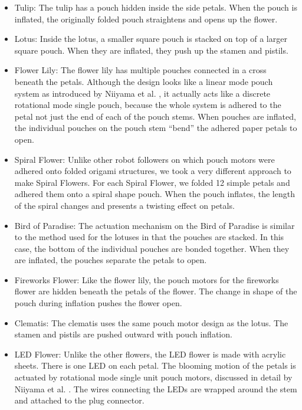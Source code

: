 \documentclass[letterpaper, 10 pt, conference]{ieeeconf}  %
\begin{document}
\begin{itemize}
	
	\item Tulip: The tulip has a pouch hidden inside the side petals. When the pouch is inflated, the originally folded pouch straightens and opens up the flower.
	\item Lotus: Inside the lotus, a smaller square pouch is stacked on top of a larger square pouch. When they are inflated, they push up the stamen and pistils.
	\item Flower Lily: The flower lily has multiple pouches connected in a cross beneath the petals. Although the design looks like a linear mode pouch system as introduced by Niiyama et al. \cite{NiiyamaICRA2014}, it actually acts like a discrete rotational mode single pouch, because the whole system is adhered to the petal not just the end of each of the pouch stems. When pouches are inflated, the individual pouches on the pouch stem ``bend'' the adhered paper petals to open.
	\item Spiral Flower: Unlike other robot followers on which pouch motors were adhered onto folded origami structures, we took a very different approach to make Spiral Flowers. For each Spiral Flower, we folded 12 simple petals and adhered them onto a spiral shape pouch. When the pouch inflates, the length of the spiral changes and presents a twisting effect on petals.
	\item Bird of Paradise: The actuation mechanism on the Bird of Paradise is similar to the method used for the lotuses in that the pouches are stacked. In this case, the bottom of the individual pouches are bonded together. When they are inflated, the pouches separate the petals to open.
	\item Fireworks Flower:  Like the flower lily, the pouch motors for the fireworks flower are hidden beneath the petals of the flower. The change in shape of the pouch during inflation pushes the flower open.
	\item Clematis: The clematis uses the same pouch motor design as the lotus. The stamen and pistils are pushed outward with pouch inflation.
	\item LED Flower: Unlike the other flowers, the LED flower is made with acrylic sheets. There is one LED on each petal. The blooming motion of the petals is actuated by rotational mode single unit pouch motors, discussed in detail by Niiyama et al. \cite{NiiyamaICRA2014}. The wires connecting the LEDs are wrapped around the stem and attached to the plug connector. 
	
\end{itemize}
\end{document}
